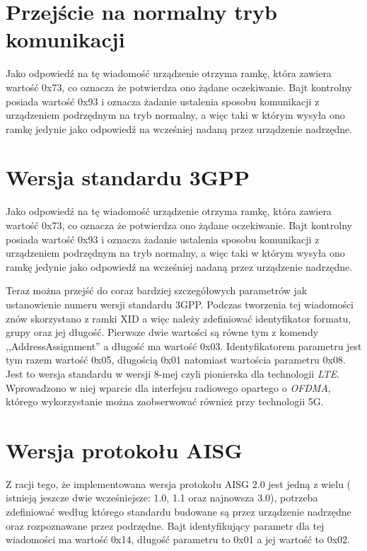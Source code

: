 \section{Przejście na normalny tryb komunikacji}
Jako odpowiedź na tę wiadomość urządzenie otrzyma ramkę, która zawiera wartość 0x73, co oznacza że 
potwierdza ono żądane oczekiwanie.
\newline\newline
Bajt kontrolny posiada wartość 0x93 i oznacza żadanie ustalenia sposobu komunikacji z urządzeniem podrzędnym na tryb normalny, 
a więc taki w którym wysyła ono ramkę jedynie jako odpowiedź na wcześniej nadaną przez urządzenie nadrzędne.

\section{Wersja standardu 3GPP}
Jako odpowiedź na tę wiadomość urządzenie otrzyma ramkę, która zawiera wartość 0x73, co oznacza że 
potwierdza ono żądane oczekiwanie.
\newline\newline
Bajt kontrolny posiada wartość 0x93 i oznacza żadanie ustalenia sposobu komunikacji z urządzeniem podrzędnym na tryb normalny, 
a więc taki w którym wysyła ono ramkę jedynie jako odpowiedź na wcześniej nadaną przez urządzenie nadrzędne.

Teraz można przejść do coraz bardziej szczegółowych parametrów jak ustanowienie numeru wersji standardu 3GPP.
Podczas tworzenia tej wiadomości znów skorzystano z ramki XID a więc należy zdefiniować identyfikator formatu, grupy oraz jej długość.
Pierwsze dwie wartości są równe tym z komendy ,,AddressAssignment'' a długość ma wartość 0x03.
Identyfikatorem parametru jest tym razem wartość 0x05, długością 0x01 natomiast wartościa parametru 0x08.
Jest to wersja standardu w wersji 8-mej czyli pionierska dla technologii \textit{LTE}.
Wprowadzono w niej wparcie dla interfejsu radiowego opartego o \textit{OFDMA}, którego wykorzystanie można zaobserwować również przy technologii 5G.

\section{Wersja protokołu AISG}
Z racji tego, że implementowana wersja protokołu AISG 2.0 jest jedną z wielu ( istnieją jeszcze dwie wcześniejsze: 1.0, 1.1 oraz najnowsza 3.0),
potrzeba zdefiniować według którego standardu budowane są przez urządzenie nadrzędne oraz rozpoznawane przez podrzędne.
Bajt identyfikujący parametr dla tej wiadomości ma wartość 0x14, długość parametru to 0x01 a jej wartość to 0x02.